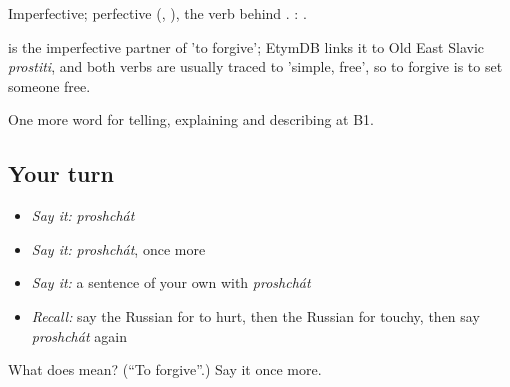 Imperfective; perfective  (, ), the verb behind \emph{}. \emph{  }:   .

\begin{cousinweb}
\emph{} is the imperfective partner of \emph{} 'to forgive'; EtymDB links it to Old East Slavic \emph{prostiti}, and both verbs are usually traced to \emph{} 'simple, free', so to forgive is to set someone free.
\end{cousinweb}

\begin{grammarlens}[title={What you've built}]
One more word for telling, explaining and describing at B1.
\end{grammarlens}

\subsection*{Your turn}
\begin{itemize}
\raggedright
  \item \emph{Say it:} \emph{proshchát}
  \item \emph{Say it:} \emph{proshchát}, once more
  \item \emph{Say it:} a sentence of your own with \emph{proshchát}
  \item \emph{Recall:} say the Russian for to hurt, then the Russian for touchy, then say \emph{proshchát} again
\end{itemize}

\begin{tcolorbox}[breakable,colback=teal!4,colframe=teal!35!black,title={Before you move on}]
What does  mean? (\textquotedblleft{}To forgive\textquotedblright{}.) Say it once more.
\end{tcolorbox}
